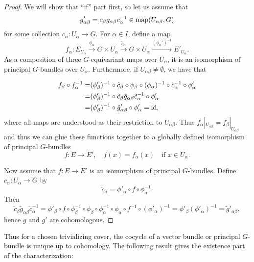 \documentclass[a4paper,openany]{scrbook}
\begin{document}
\begin{proof}
We will show that ``if'' part first, so let us assume that
\[
g'_{\alpha\beta} = c_\beta g_{\alpha\beta} c_\alpha^{-1} \in \operatorname{map}(U_{\alpha\beta},G)
\]
for some collection $c_\alpha\colon U_\alpha \to G$. For $\alpha \in I$, define a map
\[
f_\alpha\colon E_{U_\alpha} \xrightarrow{\phi_\alpha} G \times U_\alpha \xrightarrow{\tilde c_\alpha} G \times U_\alpha \xrightarrow{(\phi_\alpha')^{-1}} E'_{U_\alpha}.
\]
As a composition of three $G$-equivariant maps over $U_\alpha$, it is an isomorphism of principal $G$-bundles over $U_\alpha$. Furthermore, if $U_{\alpha\beta} \neq \emptyset$, we have that

\begin{align*}
f_\beta \circ f_\alpha^{-1} =& (\phi'_\beta)^{-1} \circ \tilde c_\beta \circ \phi_{\beta} \circ (\phi_{\alpha})^{-1} \circ \tilde c_\alpha^{-1} \circ \phi'_\alpha\\
=& (\phi'_\beta)^{-1} \circ \tilde c_\beta \tilde g_{\alpha\beta}\tilde c_{\alpha}^{-1} \circ \phi'_\alpha\\
= & (\phi'_\beta)^{-1} \circ \tilde g'_{\alpha\beta} \circ \phi'_\alpha = \operatorname{id},
\end{align*}
where all maps are understood as their restriction to $U_{\alpha\beta}$. Thus $f_\alpha|_{U_{\alpha\beta}} = f_\beta|_{U_{\alpha\beta}}$ and thus we can glue these functions together to a globally defined isomorphism of principal $G$-bundles
\[
f\colon E \to E', \quad f(x) = f_\alpha(x) \quad \text{if } x \in U_\alpha.
\]

Now assume that $f\colon E \to E'$ is an isomorphism of principal $G$-bundles. Define $c_\alpha\colon U_\alpha \to G$ by 
\[
\tilde c_\alpha = \phi'_\alpha \circ f \circ \phi_\alpha^{-1}.
\]
Then
\[
\tilde c_\beta \tilde g_{\alpha\beta} \tilde c_\alpha^{-1} = \phi'_\beta \circ f \circ \phi_\beta^{-1} \circ \phi_\beta \circ \phi_\alpha^{-1} \circ \phi_\alpha \circ f^{-1} \circ (\phi'_\alpha)^{-1} =  \phi'_\beta (\phi'_{\alpha})^{-1} = \tilde g'_{\alpha\beta},
\]
hence $g$ and $g'$ are cohomologous.
\end{proof}

Thus for a chosen trivializing cover, the cocycle of a vector bundle or principal $G$-bundle is unique up to cohomology. The following result gives the existence part of the characterization:
\end{document}
